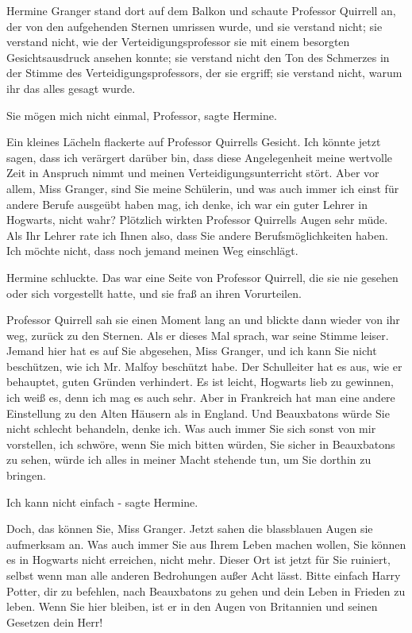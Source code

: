 Hermine Granger stand dort auf dem Balkon und schaute Professor Quirrell an, der
von den aufgehenden Sternen umrissen wurde, und sie verstand nicht; sie verstand
nicht, wie der Verteidigungsprofessor sie mit einem besorgten Gesichtsausdruck
ansehen konnte; sie verstand nicht den Ton des Schmerzes in der Stimme des
Verteidigungsprofessors, der sie ergriff; sie verstand nicht, warum ihr das
alles gesagt wurde.

\glqq Sie mögen mich nicht einmal, Professor\grqq{}, sagte Hermine.

Ein kleines Lächeln flackerte auf Professor Quirrells Gesicht. \glqq Ich könnte
jetzt sagen, dass ich verärgert darüber bin, dass diese Angelegenheit meine
wertvolle Zeit in Anspruch nimmt und meinen Verteidigungsunterricht stört. Aber
vor allem, Miss Granger, sind Sie meine Schülerin, und was auch immer ich einst
für andere Berufe ausgeübt haben mag, ich denke, ich war ein guter Lehrer in
Hogwarts, nicht wahr?\grqq{} Plötzlich wirkten Professor Quirrells Augen sehr
müde. \glqq Als Ihr Lehrer rate ich Ihnen also, dass Sie andere
Berufsmöglichkeiten haben. Ich möchte nicht, dass noch jemand meinen Weg
einschlägt.\grqq{}

Hermine schluckte. Das war eine Seite von Professor Quirrell, die sie nie
gesehen oder sich vorgestellt hatte, und sie fraß an ihren Vorurteilen.

Professor Quirrell sah sie einen Moment lang an und blickte dann wieder von ihr
weg, zurück zu den Sternen. Als er dieses Mal sprach, war seine Stimme leiser.
\glqq Jemand hier hat es auf Sie abgesehen, Miss Granger, und ich kann Sie nicht
beschützen, wie ich Mr. Malfoy beschützt habe. Der Schulleiter hat es aus, wie
er behauptet, guten Gründen verhindert. Es ist leicht, Hogwarts lieb zu
gewinnen, ich weiß es, denn ich mag es auch sehr. Aber in Frankreich hat man
eine andere Einstellung zu den Alten Häusern als in England. Und Beauxbatons
würde Sie nicht schlecht behandeln, denke ich. Was auch immer Sie sich sonst von
mir vorstellen, ich schwöre, wenn Sie mich bitten würden, Sie sicher in
Beauxbatons zu sehen, würde ich alles in meiner Macht stehende tun, um Sie
dorthin zu bringen.\grqq{}

\glqq Ich kann nicht einfach -\grqq{} sagte Hermine.

\glqq Doch, das können Sie, Miss Granger.\grqq{} Jetzt sahen die blassblauen
Augen sie aufmerksam an. \glqq Was auch immer Sie aus Ihrem Leben machen wollen,
Sie können es in Hogwarts nicht erreichen, nicht mehr. Dieser Ort ist jetzt für
Sie ruiniert, selbst wenn man alle anderen Bedrohungen außer Acht lässt. Bitte
einfach Harry Potter, dir zu befehlen, nach Beauxbatons zu gehen und dein Leben
in Frieden zu leben. Wenn Sie hier bleiben, ist er in den Augen von Britannien
und seinen Gesetzen dein Herr!\grqq{}

